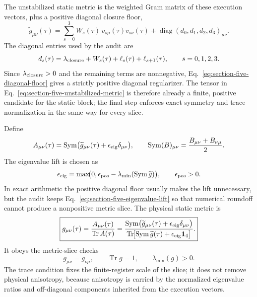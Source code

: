\documentclass[11pt]{article}
\DeclareMathOperator{\Tr}{Tr}
\DeclareMathOperator{\diag}{diag}
\begin{document}
The unstabilized static metric is the weighted Gram matrix of these execution
vectors, plus a positive diagonal closure floor,
\begin{equation}
\label{eq:section-five-unstabilized-metric}
 \widetilde g_{\mu\nu}(\tau)
 =
 \sum_{s=0}^{3}
 W_s(\tau)\,v_{s\mu}(\tau)v_{s\nu}(\tau)
 +
 \diag(d_0,d_1,d_2,d_3)_{\mu\nu}.
\end{equation}
The diagonal entries used by the audit are
\begin{equation}
\label{eq:section-five-diagonal-floor}
 d_s(\tau)
 =
 \lambda_{\rm closure}+W_s(\tau)+\ell_s(\tau)+\ell_{s+1}(\tau),
 \qquad
 s=0,1,2,3.
\end{equation}
Since $\lambda_{\rm closure}>0$ and the remaining terms are nonnegative,
Eq.~\eqref{eq:section-five-diagonal-floor} gives a strictly positive diagonal
regularizer.  The tensor in Eq.~\eqref{eq:section-five-unstabilized-metric} is
therefore already a finite, positive candidate for the static block; the final
step enforces exact symmetry and trace normalization in the same way for every
slice.

Define
\begin{equation}
\label{eq:section-five-symmetrized-lifted-block}
 A_{\mu\nu}(\tau)
 =
 \operatorname{Sym}
 \bigl(
 \widetilde g_{\mu\nu}(\tau)+\epsilon_{\rm eig}\delta_{\mu\nu}
 \bigr),
 \qquad
 \operatorname{Sym}(B)_{\mu\nu}
 =
 \frac{B_{\mu\nu}+B_{\nu\mu}}{2}.
\end{equation}
The eigenvalue lift is chosen as
\begin{equation}
\label{eq:section-five-eigenvalue-lift}
 \epsilon_{\rm eig}
 =
 \max\!\bigl(0,\epsilon_{\rm pos}
 -\lambda_{\min}(\operatorname{Sym}\widetilde g)\bigr),
 \qquad
 \epsilon_{\rm pos}>0.
\end{equation}
In exact arithmetic the positive diagonal floor usually makes the lift
unnecessary, but the audit keeps Eq.~\eqref{eq:section-five-eigenvalue-lift} so
that numerical roundoff cannot produce a nonpositive metric slice.  The
physical static metric is
\begin{equation}
\label{eq:section-five-stabilized-trace-normalized-metric}
 \boxed{
 g_{\mu\nu}(\tau)
 =
 \frac{A_{\mu\nu}(\tau)}{\Tr A(\tau)}
 =
 \frac{
 \operatorname{Sym}
 \bigl(\widetilde g_{\mu\nu}(\tau)+\epsilon_{\rm eig}\delta_{\mu\nu}\bigr)}
 {\Tr\!\bigl[
 \operatorname{Sym}\widetilde g(\tau)
 +\epsilon_{\rm eig}\mathbf{1}_4\big]}.
 }
\end{equation}
It obeys the metric-slice checks
\begin{equation}
\label{eq:section-five-metric-checks}
 g_{\mu\nu}=g_{\nu\mu},
 \qquad
 \Tr g=1,
 \qquad
 \lambda_{\min}(g)>0.
\end{equation}
The trace condition fixes the finite-register scale of the slice; it does not
remove physical anisotropy, because anisotropy is carried by the normalized
eigenvalue ratios and off-diagonal components inherited from the execution
vectors.
\end{document}
